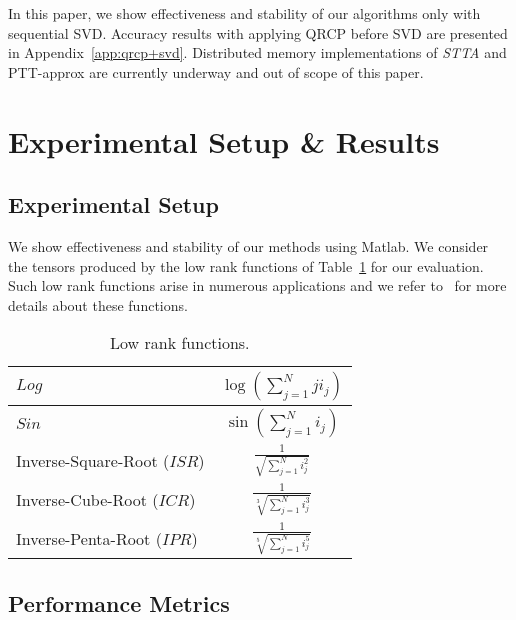 \documentclass[sigconf]{acmart}
\newcommand{\otta}{{\it STTA}\xspace}
\begin{document}
In this paper, we show effectiveness and stability of our algorithms only with sequential SVD. Accuracy results with applying QRCP before SVD are presented in Appendix~\ref{app:qrcp+svd}. Distributed memory implementations of \otta and PTT-approx are currently underway and out of scope of this paper.


\section{Experimental Setup \& Results}
\label{sec:expResults}
\subsection{Experimental Setup}
We show effectiveness and stability of our methods using Matlab. 
We consider the tensors produced by the low rank functions of Table~\ref{tab:lowRankFunctions} for our evaluation. Such low rank functions arise in numerous applications and we refer to~\cite{lowRankFunctions,lowRankFunction-BM-2005,lowRankFunction-HKT-2005} for more details about these functions.

\begin{table}[htb]
	\centering
	\begin{tabular}{|l|c|}
		\hline
		$Log$ & $\log(\sum_{j=1}^{N}j i_j)$\\ \hline
		$Sin$ & $\sin(\sum_{j=1}^{N}i_j)$\\ \hline
		Inverse-Square-Root ($ISR$) & $\frac{1}{\sqrt{\sum_{j=1}^{N}i_j^2}}$\\ \hline
		Inverse-Cube-Root ($ICR$) & $\frac{1}{\sqrt[3]{\sum_{j=1}^{N}i_j^3}}$\\ \hline
		Inverse-Penta-Root ($IPR$) & $\frac{1}{\sqrt[5]{\sum_{j=1}^{N}i_j^5}}$\\ \hline
	\end{tabular}
	\caption{Low rank functions.\label{tab:lowRankFunctions}\vspace*{-0.35cm}}
\end{table}

\subsection{Performance Metrics}
\end{document}
